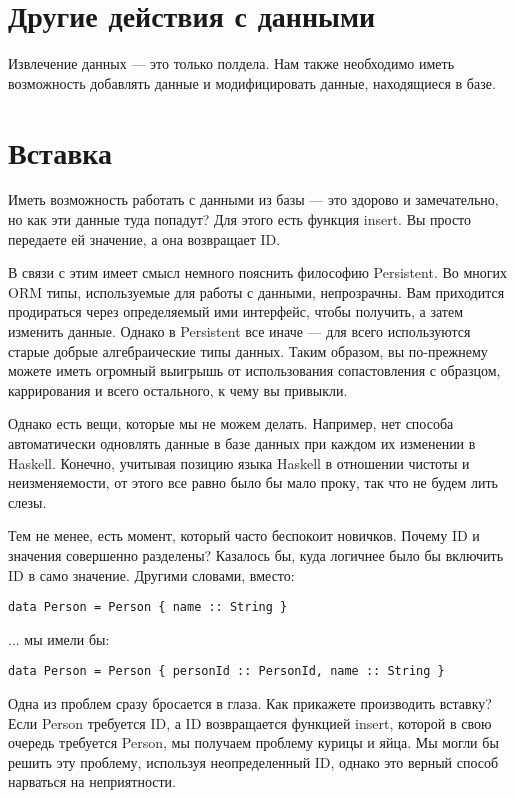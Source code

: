\section{Другие действия с данными} %

Извлечение данных --- это только полдела. Нам также необходимо иметь возможность добавлять данные и модифицировать данные, находящиеся в базе.

\section{Вставка} %

Иметь возможность работать с данными из базы --- это здорово и замечательно, но как эти данные туда попадут? Для этого есть функция insert. Вы просто передаете ей значение, а она возвращает ID.

В связи с этим имеет смысл немного пояснить философию Persistent. Во многих ORM типы, используемые для работы с данными, непрозрачны. Вам приходится продираться через определяемый ими интерфейс, чтобы получить, а затем изменить данные. Однако в Persistent все иначе --- для всего используются старые добрые алгебраические типы данных. Таким образом, вы по-прежнему можете иметь огромный выигрышь от использования сопастовления с образцом, каррирования и всего остального, к чему вы привыкли.

Однако есть вещи, которые мы не можем делать. Например, нет способа автоматически одновлять данные в базе данных при каждом их изменении в Haskell. Конечно, учитывая позицию языка Haskell в отношении чистоты и неизменяемости, от этого все равно было бы мало проку, так что не будем лить слезы.

Тем не менее, есть момент, который часто беспокоит новичков. Почему ID и значения совершенно разделены? Казалось бы, куда логичнее было бы включить ID в само значение. Другими словами, вместо:

\begin{lstlisting}
data Person = Person { name :: String }
\end{lstlisting}

... мы имели бы:

\begin{lstlisting}
data Person = Person { personId :: PersonId, name :: String }
\end{lstlisting}

Одна из проблем сразу бросается в глаза. Как прикажете производить вставку? Если Person требуется ID, а ID возвращается функцией insert, которой в свою очередь требуется Person, мы получаем проблему курицы и яйца. Мы могли бы решить эту проблему, используя неопределенный ID, однако это верный способ нарваться на неприятности.

